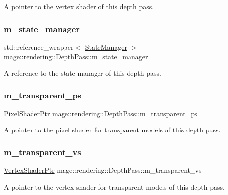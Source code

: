 A pointer to the vertex shader of this depth pass. \mbox{\label{classmage_1_1rendering_1_1_depth_pass_a86c299c8b6ec689c83c60451fd988a35}} 
\subsubsection{\texorpdfstring{m\+\_\+state\+\_\+manager}{m\_state\_manager}}
{\footnotesize\ttfamily std\+::reference\+\_\+wrapper$<$ \mbox{\hyperlink{classmage_1_1rendering_1_1_state_manager}{State\+Manager}} $>$ mage\+::rendering\+::\+Depth\+Pass\+::m\+\_\+state\+\_\+manager\hspace{0.3cm}{\ttfamily [private]}}

A reference to the state manager of this depth pass. \mbox{\label{classmage_1_1rendering_1_1_depth_pass_a6ef4d5064ab4cb485ae77cb230f90c6a}} 
\subsubsection{\texorpdfstring{m\+\_\+transparent\+\_\+ps}{m\_transparent\_ps}}
{\footnotesize\ttfamily \mbox{\hyperlink{namespacemage_1_1rendering_af03d922b228ee9c8542baaa2ecc9f259}{Pixel\+Shader\+Ptr}} mage\+::rendering\+::\+Depth\+Pass\+::m\+\_\+transparent\+\_\+ps\hspace{0.3cm}{\ttfamily [private]}}

A pointer to the pixel shader for transparent models of this depth pass. \mbox{\label{classmage_1_1rendering_1_1_depth_pass_ab505e6b33ab449c2b7914d93e728eabb}} 
\subsubsection{\texorpdfstring{m\+\_\+transparent\+\_\+vs}{m\_transparent\_vs}}
{\footnotesize\ttfamily \mbox{\hyperlink{namespacemage_1_1rendering_aaf704b9c54a4181f4950a1761de69dda}{Vertex\+Shader\+Ptr}} mage\+::rendering\+::\+Depth\+Pass\+::m\+\_\+transparent\+\_\+vs\hspace{0.3cm}{\ttfamily [private]}}

A pointer to the vertex shader for transparent models of this depth pass. 
